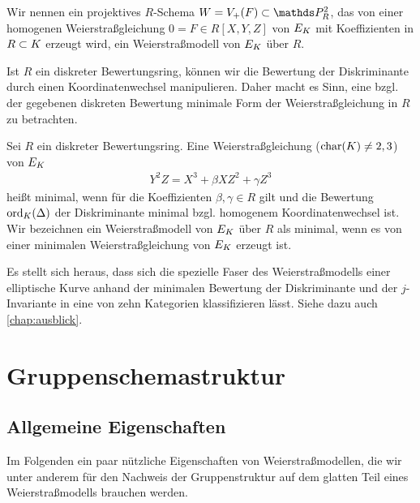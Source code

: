 \begin{Definition}[Weierstraßmodell]
  Wir nennen ein projektives $R$-Schema $W=V_+(F)\subset\P_R^2$, das
  von einer homogenen Weierstraßgleichung $0=F\in R[X,Y,Z]$ von $E_{K}$
  mit Koeffizienten in $R\subset K$ erzeugt wird,
  ein Weierstraßmodell von $E_{K}$ über $R$.
\end{Definition}

Ist $R$ ein diskreter Bewertungsring, können wir die Bewertung der
Diskriminante durch einen Koordinatenwechsel manipulieren. Daher macht
es Sinn, eine bzgl. der gegebenen diskreten Bewertung minimale
Form der Weierstraßgleichung in $R$ zu betrachten.
\begin{Definition}
  Sei $R$ ein diskreter Bewertungsring.
  Eine Weierstraßgleichung ($\operatorname{char}(K)\neq2,3$) von $E_{K}$
  \begin{gather*}
    Y^2Z = X^3 + \beta XZ^2 + \gamma Z^3
  \end{gather*}
  heißt minimal, wenn für die Koeffizienten $\beta, \gamma\in R$ gilt
  und die Bewertung $\operatorname{ord}_{K}(\Delta)$ der Diskriminante minimal
  bzgl. homogenem Koordinatenwechsel ist.
  Wir bezeichnen ein Weierstraßmodell von $E_{K}$ über $R$ als minimal,
  wenn es von einer minimalen Weierstraßgleichung von $E_{K}$ erzeugt
  ist.
\end{Definition}
Es stellt sich heraus, dass sich die spezielle Faser des
Weierstraßmodells einer elliptische Kurve anhand der minimalen
Bewertung der Diskriminante und der $j$-Invariante in eine von zehn
Kategorien klassifizieren lässt. Siehe dazu auch \autoref{chap:ausblick}. 


\section{Gruppenschemastruktur}\label{chap:weierstraßgruppe}
\subsection{Allgemeine Eigenschaften}
Im Folgenden ein paar nützliche Eigenschaften von Weierstraßmodellen,
die wir unter anderem für den Nachweis der Gruppenstruktur auf dem
glatten Teil eines Weierstraßmodells brauchen werden.

